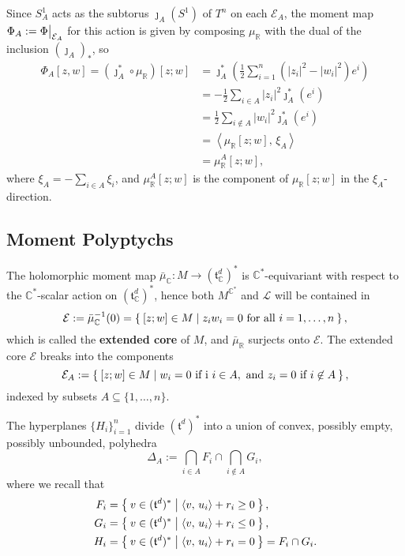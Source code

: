 \documentclass{article}
\newcommand{\ra}{\rightarrow}
\newcommand{\RR}{\mathbb{R}}
\newcommand{\CC}{\mathbb{C}}
\newcommand{\mcE}{\mathcal{E}}
\newcommand{\mcL}{\mathcal{L}}
\newcommand{\mft}{\mathfrak{t}}
\newcommand\restr[2]{{%
		\left.\kern-\nulldelimiterspace %
		#1 %
		\vphantom{\big|} %
		\right|_{#2} %
}}
\begin{document}
	Since $S_{A}^{1}$ acts as the subtorus $\jmath_{A}(S^{1})$ of $T^{n}$ on each $\mcE_{A}$, the moment map $\Phi_{A} := \restr{\Phi}{\mcE_{A}}$ for this action is given by composing $\mu_{\RR}$ with the dual of the inclusion $(\jmath_{A})_{\ast}$, so
	\[
	\begin{split}
		\Phi_{A}[z,w] = \left( \jmath_{A}^{\ast} \circ \mu_{\RR} \right)[z;w] &= \jmath_{A}^{\ast} \left( \frac{1}{2} \sum_{i = 1}^{n} \left( |z_{i}|^{2} - |w_{i}|^{2} \right) e^{i} \right) \\
		&= -\frac{1}{2} \sum_{i \in A} |z_{i}|^{2} \jmath_{A}^{\ast}(e^{i}) \\
		&= \frac{1}{2} \sum_{i \not\in A} |w_{i}|^{2} \jmath_{A}^{\ast}(e^{i}) \\
		&= \left\langle \mu_{\RR}[z;w],\, \xi_{A} \right\rangle \\
		&= \mu_{\RR}^{A}[z;w],
	\end{split}
	\]
	where $\xi_{A} = -\sum_{i \in A} \xi_{i}$, and $\mu_{\RR}^{A}[z;w]$ is the component of $\mu_{\RR}[z;w]$ in the $\xi_{A}$-direction.
	
	\subsection{Moment Polyptychs}
	
	
	The holomorphic moment map $\bar{\mu}_{\CC} : M \ra (\mft_{\CC}^{d})^{\ast}$ is $\CC^{\ast}$-equivariant with respect to the $\CC^{\ast}$-scalar action on $(\mft_{\CC}^{d})^{\ast}$, hence both $M^{\CC^{\ast}}$ and $\mcL$ will be contained in
	\[
		\mcE := \bar{\mu}_{\CC}^{-1}(0) = \Set{[z;w] \in M | z_{i}w_{i} = 0 \text{ for all } i = 1, \ldots, n },
	\]
	which is called the \textbf{extended core} of $M$, and $\bar{\mu}_{\RR}$ surjects onto $\mcE$. The extended core $\mcE$ breaks into the components
	\[
		\mcE_{A} := \Set{ [z;w] \in M | w_{i} = 0 \text{ if i } i \in A, \text{ and } z_{i} = 0 \text{ if } i \not\in A },
	\]
	indexed by subsets $A \subseteq \{1, \ldots, n\}$.
	
	The hyperplanes $\{H_{i}\}_{i = 1}^{n}$ divide $(\mft^{d})^{\ast}$ into a union of convex, possibly empty, possibly unbounded, polyhedra
	\[
		\Delta_{A} := \bigcap_{i \in A} F_{i} \cap \bigcap_{i \not\in A} G_{i},
	\]
	where we recall that
	\[
		\begin{split}
			F_{i} &= \Set{v \in (\mft^{d})^{\ast} | \langle v,\, u_{i} \rangle + r_{i} \geq 0 }, \\
			G_{i} &= \Set{v \in (\mft^{d})^{\ast} | \langle v,\, u_{i} \rangle + r_{i} \leq 0 }, \\
			H_{i} &= \Set{v \in (\mft^{d})^{\ast} | \langle v,\, u_{i} \rangle + r_{i} = 0 } = F_{i} \cap G_{i}.
		\end{split}
	\]
	
\end{document}

